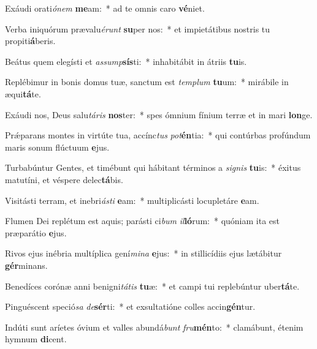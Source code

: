 \item Exáudi orati\textit{ó}\textit{nem} \textbf{me}am:~* ad te omnis caro \textbf{vé}niet.
\item Verba iniquórum prævalu\textit{é}\textit{runt} \textbf{su}per nos:~* et impietátibus nostris tu propiti\textbf{á}beris.
\item Beátus quem elegísti et \textit{as}\textit{sump}\textbf{sís}ti:~* inhabitábit in átriis \textbf{tu}is.
\item Replébimur in bonis domus tuæ, sanctum est \textit{tem}\textit{plum} \textbf{tu}um:~* mirábile in æqui\textbf{tá}te.
\item Exáudi nos, Deus salu\textit{tá}\textit{ris} \textbf{nos}ter:~* spes ómnium fínium terræ et in mari \textbf{lon}ge.
\item Prǽparans montes in virtúte tua, accínc\textit{tus} \textit{pot}\textbf{én}tia:~* qui contúrbas profúndum maris sonum flúctuum \textbf{e}jus.
\item Turbabúntur Gentes, et timébunt qui hábitant términos a \textit{si}\textit{gnis} \textbf{tu}is:~* éxitus matutíni, et véspere delec\textbf{tá}bis.
\item Visitásti terram, et inebri\textit{ás}\textit{ti} \textbf{e}am:~* multiplicásti locupletáre \textbf{e}am.
\item Flumen Dei replétum est aquis; parásti ci\textit{bum} \textit{il}\textbf{ló}rum:~* quóniam ita est præparátio \textbf{e}jus.
\item Rivos ejus inébria multíplica gení\textit{mi}\textit{na} \textbf{e}jus:~* in stillicídiis ejus lætábitur \textbf{gér}minans.
\item Benedíces corónæ anni benigni\textit{tá}\textit{tis} \textbf{tu}æ:~* et campi tui replebúntur uber\textbf{tá}te.
\item Pinguéscent speció\textit{sa} \textit{de}\textbf{sér}ti:~* et exsultatióne colles accin\textbf{gén}tur.
\item Indúti sunt aríetes óvium et valles abundá\textit{bunt} \textit{fru}\textbf{mén}to:~* clamábunt, étenim hymnum \textbf{di}cent.
